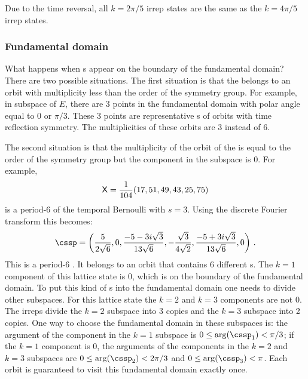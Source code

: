 Due to the time
reversal, all $k={2\pi}/{5}$ irrep states are the same as the
$k={4\pi}/{5}$ irrep states.


\subsubsection{Fundamental domain}
What happens when {\lattstate}s appear on the boundary of the fundamental domain?
There are two possible situations. The first situation is that the {\lattstate} belongs to an
orbit with multiplicity less than the order of the symmetry group. For example,
in  subspace of $E$, there are 3 points in the fundamental domain
with polar angle equal to 0 or $\pi/3$. These 3 points are representative {\lattstate}s of orbits
with time reflection symmetry. The multiplicities of these orbits are 3 instead of 6.

The second situation is that the multiplicity of
the orbit of the {\lattstate} is equal to the order of the symmetry group
but the component in the subspace is 0. For example,
\[
\mathsf{X} = \frac{1}{104} (17, 51, 49, 43, 25, 75)
\]
is a period-6 {\lattstate} of the temporal Bernoulli
 with $s=3$. Using the discrete Fourier transform
this {\lattstate} becomes:
\[
\cssp =
\left(\frac{5}{2 \sqrt{6}},0,\frac{-5-3 i \sqrt{3}}{13
   \sqrt{6}},-\frac{\sqrt{3}}{4\sqrt{2}},\frac{-5+3 i \sqrt{3}}{13 \sqrt{6}},0\right) \,.
\]
This is a period-6 {\lattstate}. It belongs to an orbit that
contains 6 different {\lattstate}s. The $k=1$ component of this lattice
state is 0, which is on the boundary of the fundamental domain. To put this kind of
{\lattstate}s into the fundamental domain one needs to divide other subspaces.
For this lattice state the $k=2$ and $k=3$ components are not 0. The irreps divide
the $k=2$ subspace into 3 copies and the $k=3$ subspace into 2 copies. One way to
choose the fundamental domain in these subspaces is: the argument of the component
in the $k=1$ subspace is $0\leq\arg(\cssp_{1})<\pi/3$; if the $k=1$ component
is 0, the arguments of the components
in the $k=2$ and $k=3$ subspaces are $0\leq\arg(\cssp_{2})<2\pi/3{}$ and
$0\leq\arg(\cssp_{3})<\pi$. Each orbit is guaranteed to visit this fundamental
domain exactly once.
